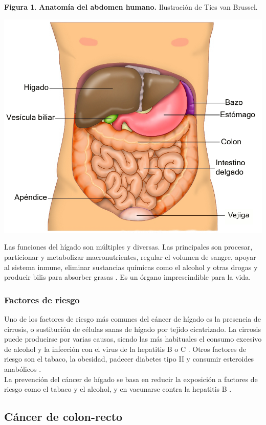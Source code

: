 \textbf{Figura 1}. \textbf{Anatomía del abdomen humano.} Ilustración de Ties van Brussel.
\begin{center}
\includegraphics[width=.70\textwidth]{figuras/anatomia_higado.png} \\
\end{center}

Las funciones del hígado son múltiples y diversas. Las principales son procesar, particionar y metabolizar macronutrientes, regular el volumen de sangre, apoyar al sistema inmune, eliminar sustancias químicas como el alcohol y otras drogas y producir bilis para absorber grasas \cite{Trefts2017}. Es un órgano imprescindible para la vida.

\subsubsection{Factores de riesgo}

Uno de los factores de riesgo más comunes del cáncer de hígado es la presencia de cirrosis, o sustitución de células sanas de hígado por tejido cicatrizado. La cirrosis puede producirse por varias causas, siendo las más habituales el consumo excesivo de alcohol y la infección con el virus de la hepatitis B o C \cite{AmericanCancerSociety2019}. Otros factores de riesgo son el tabaco, la obesidad, padecer diabetes tipo II y consumir esteroides anabólicos \cite{AmericanCancerSociety2019, Marrero2005}.\\

La prevención del cáncer de hígado se basa en reducir la exposición a factores de riesgo como el tabaco y el alcohol, y en vacunarse contra la hepatitis B \cite{AmericanCancerSociety2019}.


\subsection{Cáncer de colon-recto}


